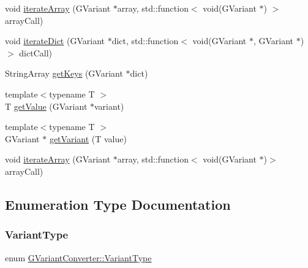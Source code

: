 \begin{DoxyCompactItemize}
\item 
void \mbox{\hyperlink{namespaceGVariantConverter_ac105645f6bace764cca896fe105e0f00}{iterate\+Array}} (G\+Variant $\ast$array, std\+::function$<$ void(G\+Variant $\ast$) $>$ array\+Call)
\item 
void \mbox{\hyperlink{namespaceGVariantConverter_a76ecfa2986842f3557fa749b4aead5e4}{iterate\+Dict}} (G\+Variant $\ast$dict, std\+::function$<$ void(G\+Variant $\ast$, G\+Variant $\ast$)$>$ dict\+Call)
\item 
String\+Array \mbox{\hyperlink{namespaceGVariantConverter_a3b9abc41c48da923097add529a878405}{get\+Keys}} (G\+Variant $\ast$dict)
\item 
{\footnotesize template$<$typename T $>$ }\\T \mbox{\hyperlink{namespaceGVariantConverter_ab995fcef33ed2973f2a285fc106bf9cd}{get\+Value}} (G\+Variant $\ast$variant)
\item 
{\footnotesize template$<$typename T $>$ }\\G\+Variant $\ast$ \mbox{\hyperlink{namespaceGVariantConverter_aa400a26a90b7fd47ac755d59282e8417}{get\+Variant}} (T value)
\item 
void \mbox{\hyperlink{namespaceGVariantConverter_aa4f289933a9e323d7bceb6b3bf375eb7}{iterate\+Array}} (G\+Variant $\ast$array, std\+::function$<$ void(G\+Variant $\ast$)$>$ array\+Call)
\end{DoxyCompactItemize}


\subsection{Enumeration Type Documentation}
\mbox{\label{namespaceGVariantConverter_a3d2966908c9f278ec06ff1632cd718bb}} 
\subsubsection{\texorpdfstring{Variant\+Type}{VariantType}}
{\footnotesize\ttfamily enum \mbox{\hyperlink{namespaceGVariantConverter_a3d2966908c9f278ec06ff1632cd718bb}{G\+Variant\+Converter\+::\+Variant\+Type}}}

